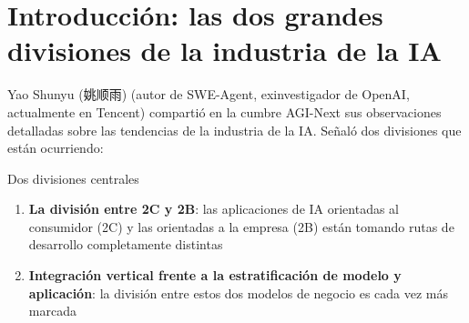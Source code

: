 \section{Introducción: las dos grandes divisiones de la industria de la IA}

Yao Shunyu (姚顺雨) (autor de SWE-Agent, exinvestigador de OpenAI, actualmente en Tencent) compartió en la cumbre AGI-Next sus observaciones detalladas sobre las tendencias de la industria de la IA. Señaló dos divisiones que están ocurriendo:

\begin{importantbox}{Dos divisiones centrales}
\begin{enumerate}
\item \textbf{La división entre 2C y 2B}: las aplicaciones de IA orientadas al consumidor (2C) y las orientadas a la empresa (2B) están tomando rutas de desarrollo completamente distintas
\item \textbf{Integración vertical frente a la estratificación de modelo y aplicación}: la división entre estos dos modelos de negocio es cada vez más marcada
\end{enumerate}
\end{importantbox}

